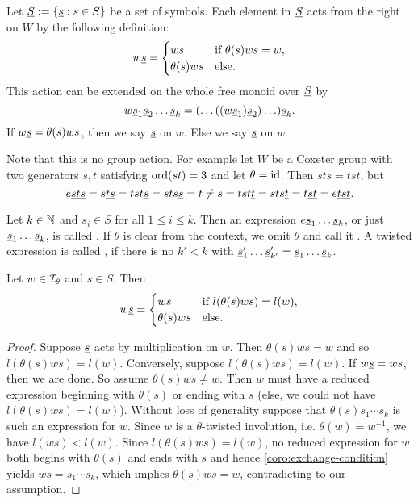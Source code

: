 \begin{defi}
	Let $\underline{S} := \{ \underline{s} : s \in S \}$ be a set of symbols. Each element in $\underline{S}$ acts from the right on $W$ by the following definition:
	$$ w \underline{s} = \begin{cases}
		ws & \textrm{if } \theta(s)ws = w, \\
		\theta(s)ws & \textrm{else}. \\
	\end{cases} $$
	This action can be extended on the whole free monoid over $\underline{S}$ by
	$$ w \underline{s}_1 \underline{s}_2 \ldots \underline{s}_k = (\ldots ((w \underline{s}_1) \underline{s}_2) \ldots) \underline{s}_k. $$
	If $w \underline{s} = \theta(s)ws$, then we say $\underline{s}$  on $w$. Else we say $\underline{s}$  on $w$.
\end{defi}

Note that this is no group action. For example let $W$ be a Coxeter group with two generators $s,t$ satisfying $\operatorname{ord}(st) = 3$ and let $\theta = \operatorname{id}$. Then $sts = tst$, but
$$ e \underline{s} \underline{t} \underline{s} = s \underline{t} \underline{s} = tst \underline{s} = sts \underline{s} = t \neq s = tst \underline{t} = sts \underline{t} = t \underline{s} \underline{t} = e \underline{t} \underline{s} \underline{t}. $$

\begin{defi}
	Let $k \in \mathbb{N}$ and $s_{i} \in S$ for all $1 \leq i \leq k$. Then an expression $e \underline{s}_1 \ldots \underline{s}_k$, or just $\underline{s}_1 \ldots \underline{s}_k$, is called . If $\theta$ is clear from the context, we omit $\theta$ and call it . A twisted expression is called , if there is no $k' < k$ with $\underline{s}'_1 \ldots \underline{s}'_{k'} = \underline{s}_1 \ldots \underline{s}_k$.
\end{defi}

\begin{lemm}
	Let $w \in \mathcal{I}_{\theta}$ and $s \in S$. Then
	$$ w \underline{s} = \begin{cases}
		ws & \textrm{if } l(\theta(s)ws) = l(w), \\
		\theta(s)ws & \textrm{else}. \\
	\end{cases} $$

	\begin{proof}
		Suppose $\underline{s}$ acts by multiplication on $w$. Then $\theta(s)ws = w$ and so $l(\theta(s)ws) = l(w)$. Conversely, suppose $l(\theta(s)ws) = l(w)$. If $w \underline{s} = ws$, then we are done. So assume $\theta(s)ws \neq w$. Then $w$ must have a reduced expression beginning with $\theta(s)$ or ending with $s$ (else, we could not have $l(\theta(s)ws) = l(w)$). Without loss of generality suppose that $\theta(s)s_1 \cdots s_k$ is such an expression for $w$. Since $w$ is a $\theta$-twisted involution, i.e. $\theta(w) = w^{-1}$, we have $l(ws) < l(w)$. Since $l(\theta(s)ws) = l(w)$, no reduced expression for $w$ both begins with $\theta(s)$ and ends with $s$ and hence \ref{coro:exchange-condition} yields $ws = s_1 \cdots s_k$, which implies $\theta(s)ws = w$, contradicting to our assumption.
	\end{proof}
\end{lemm}

